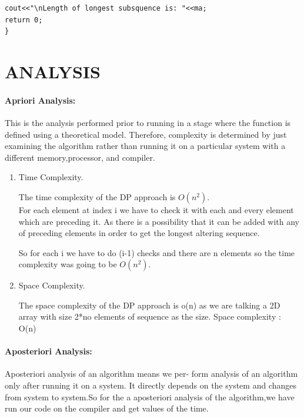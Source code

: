 \documentclass[10pt]{article}
\begin{document}
\begin{multicols*}{2}
\begin{lstlisting}
cout<<"\nLength of longest subsquence is: "<<ma;
return 0;
}
\end{lstlisting}
\section*{ANALYSIS}

\paragraph{Apriori Analysis:}   
This is the analysis performed prior to running in a stage where the function is defined using a theoretical model. Therefore, complexity is determined by just examining the algorithm rather than running it on a particular system with a different memory,processor, and compiler. 
\begin{enumerate}

\item Time Complexity.

The time complexity of the DP approach is $ O(n^2). $ \\
For each element at index i we have to check it with each and every element which are preceding it. As there is a possibility that it can be added with any of preceding elements in order to get the longest altering sequence.

So for each i we have to do (i-1) checks and there are n elements so the time complexity was going to be  $ O(n^2). $\\

\item Space Complexity.

The space complexity of the DP approach is o(n) as we are talking a 2D array with size 2*no elements of sequence as the size.
Space complexity : O(n)

\end{enumerate}

\paragraph{Aposteriori Analysis:}

Aposteriori analysis of an algorithm means we per- form analysis of an algorithm only after running it on a system. It directly depends on the system and changes from system to system.So for the a aposteriori analysis of the algorithm,we have run our code on the compiler and get values of the time.


\end{multicols*}
\end{document}
